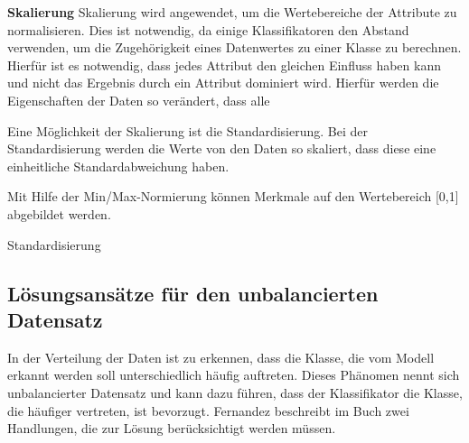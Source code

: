 


\textbf{Skalierung}
Skalierung wird angewendet, um die Wertebereiche der Attribute zu normalisieren. 
Dies ist notwendig, da einige Klassifikatoren den Abstand verwenden, um die Zugehörigkeit eines Datenwertes zu einer Klasse zu berechnen.
Hierfür ist es notwendig, dass jedes Attribut den gleichen Einfluss haben kann und nicht das Ergebnis durch ein Attribut dominiert wird. 
Hierfür werden die Eigenschaften der Daten so verändert, dass alle 

Eine Möglichkeit der Skalierung ist die Standardisierung. 
Bei der Standardisierung werden die Werte von den Daten so skaliert, dass diese eine einheitliche Standardabweichung haben. %

Mit Hilfe der Min/Max-Normierung können Merkmale auf den Wertebereich [0,1] abgebildet werden. 

Standardisierung








\subsection{Lösungsansätze für den unbalancierten Datensatz}
In der Verteilung der Daten ist zu erkennen, dass die Klasse, die vom Modell erkannt werden soll unterschiedlich häufig auftreten. 
Dieses Phänomen nennt sich unbalancierter Datensatz und kann dazu führen, dass der Klassifikator die Klasse, die häufiger vertreten, ist bevorzugt. 
Fernandez beschreibt im Buch \cite{Chapter 2 Foundations on Imbalanced Classification von Fernandez}  zwei Handlungen, die zur Lösung berücksichtigt werden müssen. 

